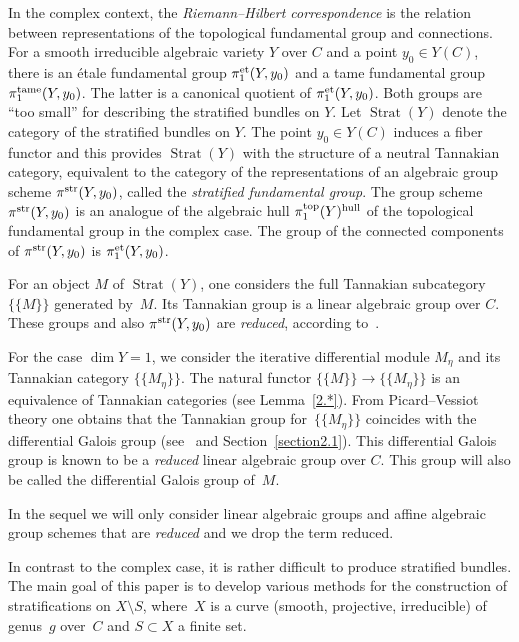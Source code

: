 \documentclass[pdftex]{sigma}
\numberwithin{equation}{section}
\begin{document}
In the complex context, the {\it Riemann--Hilbert correspondence} is the relation between representations of the topological fundamental group and connections. For a smooth irreducible algebraic variety $Y$ over $C$ and a point $y_0\in Y(C)$, there is an \'etale fundamental group $\pi^{\rm et}_1(Y,y_0)$ and a tame fundamental group $\pi_1^{\rm tame}(Y,y_0)$. The latter is a canonical quotient of $\pi^{\rm et}_1(Y,y_0)$. Both groups are ``too small'' for describing the stratified bundles on $Y$. Let $\operatorname{Strat}(Y)$ denote the category of the stratified bundles on $Y$. The point $y_0\in Y(C)$ induces a fiber functor and this provides $\operatorname{Strat}(Y)$
with the structure of a neutral Tannakian category, equivalent to the category of the representations of an algebraic group scheme $\pi^{\rm str}(Y,y_0)$, called the {\it stratified fundamental group}. The group scheme $\pi^{\rm str}(Y,y_0)$ is an analogue of the algebraic hull $\pi_1^{\rm top}(Y)^{\rm hull}$ of the topological fundamental group in the complex case. The group of the connected components of $\pi^{\rm str}(Y,y_0)$ is $\pi^{\rm et}_1(Y,y_0)$.

For an object $M$ of $\operatorname{Strat}(Y)$, one considers the full Tannakian subcategory $\{\{M\}\}$ generated by~$M$. Its Tannakian group is a linear algebraic group over $C$. These groups and also $\pi^{\rm str}(Y,y_0)$ are {\it reduced}, according to~\cite{Sa}.

For the case $\dim Y=1$, we consider the iterative differential module $M_\eta$ and its Tannakian category $\{\{M_\eta\}\}$. The natural functor $\{\{M\}\}\rightarrow \{\{M_\eta \}\}$ is an equivalence of Tannakian categories (see Lemma~\ref{2.*}). From Picard--Vessiot theory one obtains that the Tannakian group for~$\{\{M_\eta \}\}$ coincides with the differential Galois group (see~\cite{Ma-vdP1} and Section~\ref{section2.1}). This dif\-fe\-ren\-tial Galois group is known to be a {\it reduced} linear algebraic group over $C$. This group will also be called the differential Galois group of~$M$.

In the sequel we will only consider linear algebraic groups and affine algebraic group schemes that are {\it reduced} and we drop the term reduced.

In contrast to the complex case, it is rather difficult to produce stratified bundles. The main goal of this paper is to develop various methods for the construction of stratifications on $X\setminus S$, where~$X$ is a curve (smooth, projective, irreducible) of genus~$g$ over~$C$ and $S\subset X$ a finite set.
\end{document}
